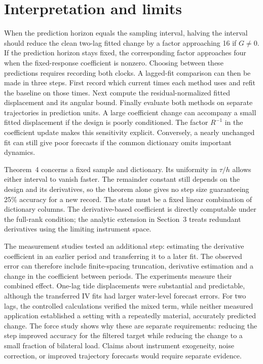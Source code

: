 \documentclass[11pt,a4paper]{article}
\begin{document}





\section{Interpretation and limits}
When the prediction horizon equals the sampling interval, halving the interval should reduce the clean two-lag fitted change by a factor approaching 16 if $G\ne0$. If the prediction horizon stays fixed, the corresponding factor approaches four when the fixed-response coefficient is nonzero. Choosing between these predictions requires recording both clocks. A lagged-fit comparison can then be made in three steps. First record which current times each method uses and refit the baseline on those times. Next compute the residual-normalized fitted displacement and its angular bound. Finally evaluate both methods on separate trajectories in prediction units. A large coefficient change can accompany a small fitted displacement if the design is poorly conditioned. The factor $R^{-1}$ in the coefficient update makes this sensitivity explicit. Conversely, a nearly unchanged fit can still give poor forecasts if the common dictionary omits important dynamics.

Theorem~4 concerns a fixed sample and dictionary. Its uniformity in $\tau/h$ allows either interval to vanish faster. The remainder constant still depends on the design and its derivatives, so the theorem alone gives no step size guaranteeing 25\% accuracy for a new record. The state must be a fixed linear combination of dictionary columns. The derivative-based coefficient is directly computable under the full-rank condition; the analytic extension in Section~3 treats redundant derivatives using the limiting instrument space.

The measurement studies tested an additional step: estimating the derivative coefficient in an earlier period and transferring it to a later fit. The observed error can therefore include finite-spacing truncation, derivative estimation and a change in the coefficient between periods. The experiments measure their combined effect. One-lag tide displacements were substantial and predictable, although the transferred IV fits had larger water-level forecast errors. For two lags, the controlled calculations verified the mixed term, while neither measured application established a setting with a repeatedly material, accurately predicted change. The force study shows why these are separate requirements: reducing the step improved accuracy for the filtered target while reducing the change to a small fraction of bilateral load. Claims about instrument exogeneity, noise correction, or improved trajectory forecasts would require separate evidence.
\end{document}
